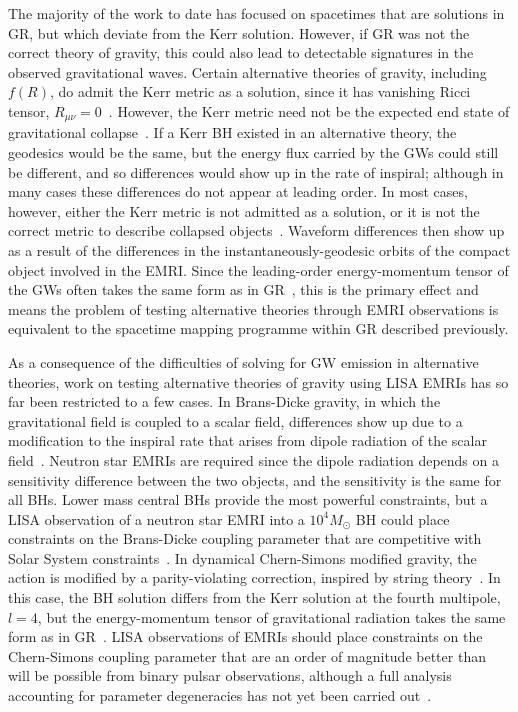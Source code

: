 \documentclass[aps,prd,amsfonts,amssymb,amsmath,nofootinbib,reprint,showpacs]{revtex4-1}
\begin{document}
The majority of the work to date has focused on spacetimes that are solutions in GR, but which deviate from the Kerr solution. However, if GR was not the correct theory of gravity, this could also lead to detectable signatures in the observed gravitational waves. Certain alternative theories of gravity, including $f(R)$, do admit the Kerr metric as a solution, since it has vanishing Ricci tensor, $R_{\mu\nu} = 0$~\cite{Psaltis2008, Yunes2011}. However, the Kerr metric need not be the expected end state of gravitational collapse~\cite{Barausse2008}. If a Kerr BH existed in an alternative theory, the geodesics would be the same, but the energy flux carried by the GWs could still be different, and so differences would show up in the rate of inspiral; although in many cases these differences do not appear at leading order. In most cases, however, either the Kerr metric is not admitted as a solution, or it is not the correct metric to describe collapsed objects~\cite{Yunes2011}. Waveform differences then show up as a result of the differences in the instantaneously-geodesic orbits of the compact object involved in the EMRI. Since the leading-order energy-momentum tensor of the GWs often takes the same form as in GR~\cite{Stein2011}, this is the primary effect and means the problem of testing alternative theories through EMRI observations is equivalent to the spacetime mapping programme within GR described previously.

As a consequence of the difficulties of solving for GW emission in alternative theories, work on testing alternative theories of gravity using LISA EMRIs has so far been restricted to a few cases. In Brans-Dicke gravity, in which the gravitational field is coupled to a scalar field, differences show up due to a modification to the inspiral rate that arises from dipole radiation of the scalar field~\cite{Berti2005}. Neutron star EMRIs are required since the dipole radiation depends on a sensitivity difference between the two objects, and the sensitivity is the same for all BHs. Lower mass central BHs provide the most powerful constraints, but a LISA observation of a neutron star EMRI into a $10^4 M_{\odot}$ BH could place constraints on the Brans-Dicke coupling parameter that are competitive with Solar System constraints~\cite{Berti2005}. In dynamical Chern-Simons modified gravity, the action is modified by a parity-violating correction, inspired by string theory~\cite{Alexander2008, Alexander2009a}. In this case, the BH solution differs from the Kerr solution at the fourth multipole, $l = 4$, but the energy-momentum tensor of gravitational radiation takes the same form as in GR~\cite{Sopuerta2009a}. LISA observations of EMRIs should place constraints on the Chern-Simons coupling parameter that are an order of magnitude better than will be possible from binary pulsar observations, although a full analysis accounting for parameter degeneracies has not yet been carried out~\cite{Sopuerta2009a}. 
\end{document}

